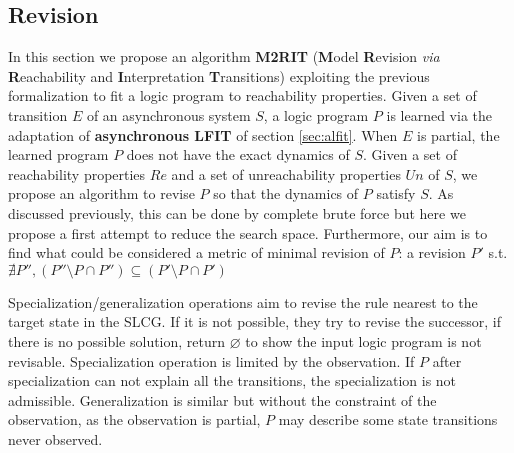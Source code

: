 \subsection{Revision}
\label{sec:algorithm}

    In this section we propose an algorithm \textbf{M2RIT} (\textbf{M}odel \textbf{R}evision \textit{via} \textbf{R}eachability and \textbf{I}nterpretation \textbf{T}ransitions) exploiting the previous formalization to fit a logic program to reachability properties.
    Given a set of transition $E$ of an asynchronous system $S$, a logic program $P$ is learned via the adaptation of \textbf{asynchronous LFIT} of section \ref{sec:alfit}.
    When $E$ is partial, the learned program $P$ does not have the exact dynamics of $S$.
    Given a set of reachability properties $Re$ and a set of unreachability properties $Un$ of $S$, we propose an algorithm to revise $P$ so that the dynamics of $P$ satisfy $S$.
    As discussed previously, this can be done by complete brute force but here we propose a first attempt to reduce the search space.
    Furthermore, our aim is to find what could be considered a metric of minimal revision of $P$:
    a revision $P'$ s.t. $\nexists P'', (P''\setminus P \cap P'')\subseteq (P' \setminus P \cap P')$
   
    Specialization/generalization operations aim to revise the rule nearest to the target state in the SLCG. If it is not possible, they try to revise the successor, if there is no possible solution, return $\varnothing$ to show the input logic program is not revisable. Specialization operation is limited by the observation. If $P$ after specialization can not explain all the transitions, the specialization is not admissible. %
    Generalization is similar but without the constraint of the observation, as the observation is partial, $P$ may describe some state transitions never observed.
   
